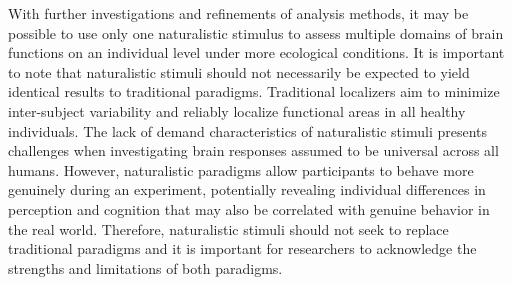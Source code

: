 With further investigations and refinements of analysis methods, it may be
possible to use only one naturalistic stimulus to assess multiple domains of
brain functions on an individual level under more ecological conditions.
%
It is important to note that naturalistic stimuli should not necessarily be
expected to yield identical results to traditional paradigms.
%
Traditional localizers aim to minimize inter-subject variability and reliably
localize functional areas in all healthy individuals.
%
The lack of demand characteristics of naturalistic stimuli presents challenges
when investigating brain responses assumed to be universal across all humans.
%
However, naturalistic paradigms allow participants to behave more genuinely
during an experiment, potentially revealing individual differences in perception
and cognition that may also be correlated with genuine behavior in the real
world.
%
Therefore, naturalistic stimuli should not seek to replace traditional paradigms
and it is important for researchers to acknowledge the strengths and limitations
of both paradigms.



